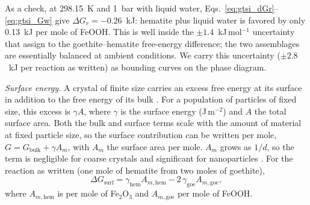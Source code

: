 As a check, at 298.15~K and 1~bar with liquid water, Eqs.~\eqref{eq:gtsi_dGr}--\eqref{eq:gtsi_Gw}
give $\Delta G_r = -0.26$~kJ: hematite plus liquid water is favored by only 0.13~kJ per mole of
FeOOH. This is well inside the $\pm1.4$~kJ\,mol$^{-1}$ uncertainty that \citet{majzlan2003}
assign to the goethite--hematite free-energy difference; the two assemblages are essentially
balanced at ambient conditions. We carry this uncertainty ($\pm2.8$~kJ per reaction as written)
as bounding curves on the phase diagram.

\textit{Surface energy.} A crystal of finite size carries an excess free energy at its
surface in addition to the free energy of its bulk \citep{gibbs1878}. For a population of
particles of fixed size, this excess is $\gamma A$, where $\gamma$ is the surface energy
(J\,m$^{-2}$) and $A$ the total surface area. Both the bulk and surface terms scale with the
amount of material at fixed particle size, so the surface contribution can be written per mole,
$G = G_{\mathrm{bulk}} + \gamma A_m$, with $A_m$ the surface area per mole. $A_m$ grows as $1/d$,
so the term is negligible for coarse crystals and significant for nanoparticles
\citep{navrotsky2008}. For the reaction as written (one mole of hematite from two moles of
goethite),
\begin{equation}
  \Delta G_{\mathrm{surf}} = \gamma_{\mathrm{hem}} A_{m,\mathrm{hem}} - 2\,\gamma_{\mathrm{goe}} A_{m,\mathrm{goe}},
  \label{eq:gtsi_dGsurf}
\end{equation}
where $A_{m,\mathrm{hem}}$ is per mole of Fe$_2$O$_3$ and $A_{m,\mathrm{goe}}$ per mole of FeOOH.

